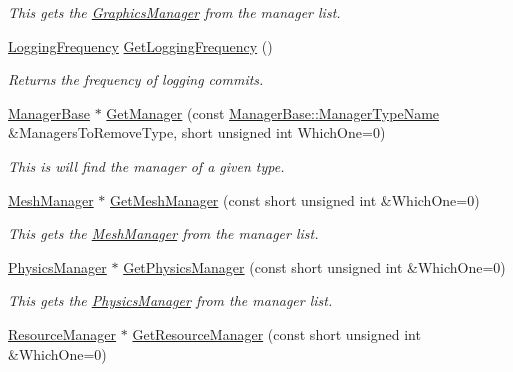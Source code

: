 \begin{DoxyCompactItemize}
\begin{DoxyCompactList}\small\item\em This gets the \hyperlink{classphys_1_1GraphicsManager}{GraphicsManager} from the manager list. \item\end{DoxyCompactList}\item 
\hyperlink{classphys_1_1World_a8c754464edbb78270fa0ee1e395b963d}{LoggingFrequency} \hyperlink{classphys_1_1World_a17c8c584fc80d8d4734b3c5a9c449ec1}{GetLoggingFrequency} ()
\begin{DoxyCompactList}\small\item\em Returns the frequency of logging commits. \item\end{DoxyCompactList}\item 
\hyperlink{classphys_1_1ManagerBase}{ManagerBase} $\ast$ \hyperlink{classphys_1_1World_a910befc904c0d0e73b913dedd08e9d98}{GetManager} (const \hyperlink{classphys_1_1ManagerBase_aaa6ccddf23892eaccb898529414f80a5}{ManagerBase::ManagerTypeName} \&ManagersToRemoveType, short unsigned int WhichOne=0)
\begin{DoxyCompactList}\small\item\em This is will find the manager of a given type. \item\end{DoxyCompactList}\item 
\hyperlink{classphys_1_1MeshManager}{MeshManager} $\ast$ \hyperlink{classphys_1_1World_a1f84e1eb14ef87edbbf7e7b44a4e142c}{GetMeshManager} (const short unsigned int \&WhichOne=0)
\begin{DoxyCompactList}\small\item\em This gets the \hyperlink{classphys_1_1MeshManager}{MeshManager} from the manager list. \item\end{DoxyCompactList}\item 
\hyperlink{classphys_1_1PhysicsManager}{PhysicsManager} $\ast$ \hyperlink{classphys_1_1World_a1b9eb6206ee15c2ef49665a07de3d83c}{GetPhysicsManager} (const short unsigned int \&WhichOne=0)
\begin{DoxyCompactList}\small\item\em This gets the \hyperlink{classphys_1_1PhysicsManager}{PhysicsManager} from the manager list. \item\end{DoxyCompactList}\item 
\hyperlink{classphys_1_1ResourceManager}{ResourceManager} $\ast$ \hyperlink{classphys_1_1World_a8a5381637922598411a4369be6904228}{GetResourceManager} (const short unsigned int \&WhichOne=0)

\end{DoxyCompactItemize}

